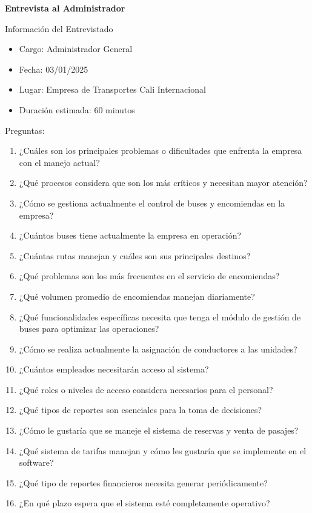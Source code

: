 	\textbf{Entrevista al Administrador}
	
	Información del Entrevistado
	\begin{itemize}[label=$-$, left=0cm, labelsep = 0.9cm, topsep = 0pt, parsep = 0pt]
		\item Cargo: Administrador General
		\item Fecha: 03/01/2025
		\item Lugar: Empresa de Transportes Cali Internacional
		\item Duración estimada: 60 minutos
	\end{itemize}
	
	Preguntas:
	
	\begin{enumerate}[left=0.1cm, labelsep = 0.9cm, topsep = 0pt, parsep = 0pt]
		\item ¿Cuáles son los principales problemas o dificultades que enfrenta la empresa con el manejo actual?
		\item ¿Qué procesos considera que son los más críticos y necesitan mayor atención?
		\item ¿Cómo se gestiona actualmente el control de buses y encomiendas en la empresa?
		\item ¿Cuántos buses tiene actualmente la empresa en operación?
		\item ¿Cuántas rutas manejan y cuáles son sus principales destinos?
		\item ¿Qué problemas son los más frecuentes en el servicio de encomiendas?
		\item ¿Qué volumen promedio de encomiendas manejan diariamente?
		\item ¿Qué funcionalidades específicas necesita que tenga el módulo de gestión de buses para optimizar las operaciones?
		\item ¿Cómo se realiza actualmente la asignación de conductores a las unidades?
		\item ¿Cuántos empleados necesitarán acceso al sistema?
		\item ¿Qué roles o niveles de acceso considera necesarios para el personal?
		\item ¿Qué tipos de reportes son esenciales para la toma de decisiones?
		\item ¿Cómo le gustaría que se maneje el sistema de reservas y venta de pasajes?
		\item ¿Qué sistema de tarifas manejan y cómo les gustaría que se implemente en el software?
		\item ¿Qué tipo de reportes financieros necesita generar periódicamente?
		\item ¿En qué plazo espera que el sistema esté completamente operativo?
	\end{enumerate}
	
